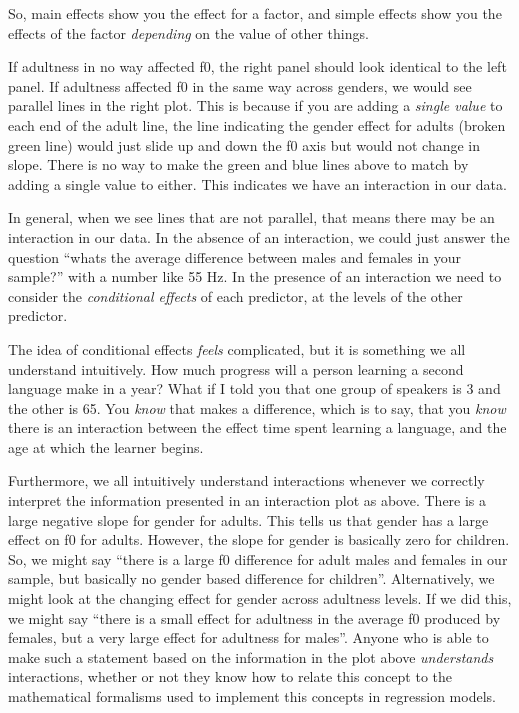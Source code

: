 \documentclass[
]{book}
\begin{document}
So, main effects show you the effect for a factor, and simple effects show you the effects of the factor \emph{depending} on the value of other things.

If adultness in no way affected f0, the right panel should look identical to the left panel. If adultness affected f0 in the same way across genders, we would see parallel lines in the right plot. This is because if you are adding a \emph{single value} to each end of the adult line, the line indicating the gender effect for adults (broken green line) would just slide up and down the f0 axis but would not change in slope. There is no way to make the green and blue lines above to match by adding a single value to either. This indicates we have an interaction in our data.

In general, when we see lines that are not parallel, that means there may be an interaction in our data. In the absence of an interaction, we could just answer the question ``whats the average difference between males and females in your sample?'' with a number like 55 Hz. In the presence of an interaction we need to consider the \emph{conditional effects} of each predictor, at the levels of the other predictor.

The idea of conditional effects \emph{feels} complicated, but it is something we all understand intuitively. How much progress will a person learning a second language make in a year? What if I told you that one group of speakers is 3 and the other is 65. You \emph{know} that makes a difference, which is to say, that you \emph{know} there is an interaction between the effect time spent learning a language, and the age at which the learner begins.

Furthermore, we all intuitively understand interactions whenever we correctly interpret the information presented in an interaction plot as above. There is a large negative slope for gender for adults. This tells us that gender has a large effect on f0 for adults. However, the slope for gender is basically zero for children. So, we might say ``there is a large f0 difference for adult males and females in our sample, but basically no gender based difference for children''. Alternatively, we might look at the changing effect for gender across adultness levels. If we did this, we might say ``there is a small effect for adultness in the average f0 produced by females, but a very large effect for adultness for males''. Anyone who is able to make such a statement based on the information in the plot above \emph{understands} interactions, whether or not they know how to relate this concept to the mathematical formalisms used to implement this concepts in regression models.
\end{document}
